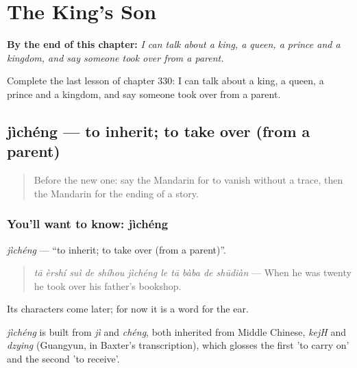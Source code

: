 
\chapter{The King's Son}
\label{ch:zh-the-king-s-son}

\begin{chapteropening}
\textbf{By the end of this chapter:} \emph{I can talk about a king, a queen, a prince and a kingdom, and say someone took over from a parent.}

Complete the last lesson of chapter 330: I can talk about a king, a queen, a prince and a kingdom, and say someone took over from a parent.
\end{chapteropening}

\section[jìchéng]{jìchéng — to inherit; to take over (from a parent)}

\label{lesson:ZH-C330-jicheng}



\begin{quote}
Before the new one: say the Mandarin for to vanish without a trace, then the Mandarin for the ending of a story.
\end{quote}

\subsection*{You'll want to know: jìchéng}
\emph{jìchéng} — \textquotedblleft{}to inherit; to take over (from a parent)\textquotedblright{}.

\begin{quote}
\emph{tā èrshí suì de shíhou jìchéng le tā bàba de shūdiàn} — When he was twenty he took over his father's bookshop.
\end{quote}

Its characters come later; for now it is a word for the ear.

\begin{cousinweb}
\emph{jìchéng} is built from \emph{jì} and \emph{chéng}, both inherited from Middle Chinese, \emph{kejH} and \emph{dzying} (Guangyun, in Baxter's transcription), which glosses the first 'to carry on' and the second 'to receive'.
\end{cousinweb}

